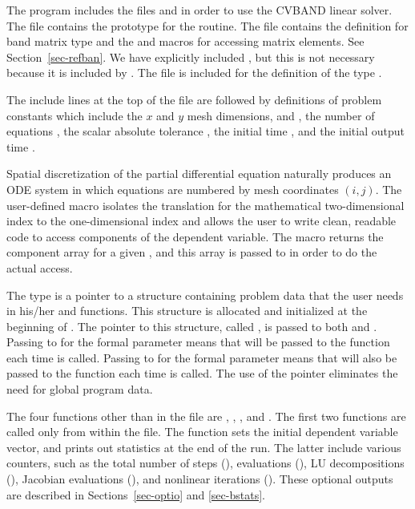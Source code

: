 The  program includes the files  and
 in order to use the CVBAND linear solver. The 
file contains the prototype for the  routine. The 
file contains the definition for band matrix type  and the
 and  macros for accessing matrix
elements. See Section~\ref{sec-refban}. We have explicitly included
, but this is not necessary because it is included by
.  The file  is included for the
definition of the type .

The include lines at the top of the file are followed by definitions of
problem constants which include the $x$ and $y$ mesh dimensions,  and
, the number of equations , the scalar absolute tolerance
, the initial time , and the initial output time .

Spatial discretization of the partial differential equation naturally
produces an ODE system in which equations are numbered by mesh
coordinates $(i,j)$. The user-defined macro
 isolates the
translation for the mathematical two-dimensional index to the
one-dimensional  index and allows the user to write
clean, readable code to access components of the dependent
variable. The  macro returns the component array for a
given , and this array is passed to 
in order to do the actual  access.

The type  is a pointer to a structure containing
problem data that the user needs in his/her  and 
functions. This structure is allocated and initialized at the beginning
of . The pointer to this structure, called ,
is passed to both  and . Passing 
to  for the formal parameter  means that
 will be passed to the  function each time  
is called.  Passing  to  for the formal parameter
 means that  will also be passed to the 
function each time  is called. The use of the 
pointer eliminates the need for global program data.

The four functions other than  in the  file are
, , , and . The first
two functions are called only from within the  file. The
 function sets the initial dependent variable
vector, and  prints out statistics at the end of
the run.  The latter include various counters,
such as the total number of steps (),  evaluations
(), LU decompositions (), 
Jacobian evaluations (), and
nonlinear iterations ().
These optional outputs are described in Sections~\ref{sec-optio}
and \ref{sec-bstats}.

